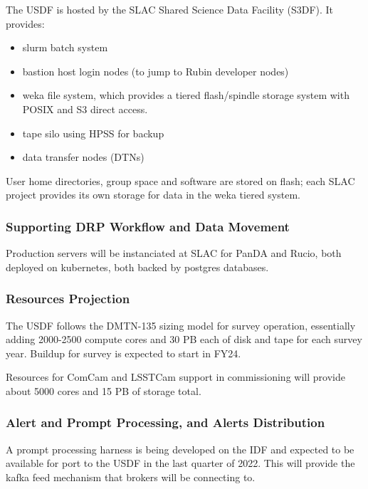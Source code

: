 The USDF is hosted by the SLAC Shared Science Data Facility (S3DF). It
provides:
\begin{itemize}
\item slurm batch system
\item bastion host login nodes (to jump to Rubin developer nodes)
\item weka file system, which provides a tiered flash/spindle storage
system with POSIX and S3 direct access.
\item tape silo using HPSS for backup
\item data transfer nodes (DTNs)
\end{itemize}

User home directories, group space and software are stored on flash;
each SLAC project provides its own storage for data in the weka tiered system.

\subsubsection{Supporting DRP Workflow and Data Movement}

Production servers will be instanciated at SLAC for PanDA and Rucio,
both deployed on kubernetes, both backed by postgres databases.

\subsubsection{Resources Projection}

The USDF follows the DMTN-135 sizing model for survey operation,
essentially adding 2000-2500 compute cores and 30 PB each of disk and
tape for each survey year. Buildup for survey is expected to start in FY24.

Resources for ComCam and LSSTCam support in commissioning will provide
about 5000 cores and 15 PB of storage total.

\subsubsection{Alert and Prompt Processing, and Alerts Distribution}

A prompt processing harness is being developed on the IDF and expected to be
available for port to the USDF in the last quarter of 2022. This will
provide the kafka feed mechanism that brokers will be connecting to.